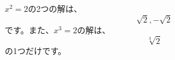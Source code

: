 \documentclass{ltjsarticle}
\begin{document}
$x^2 = 2$の2つの解は、
\[ \sqrt{2}, -\sqrt{2} \]
です。また、$x^3 = 2$の解は、
\[ \sqrt[3]{2} \]
の1つだけです。
\end{document}
